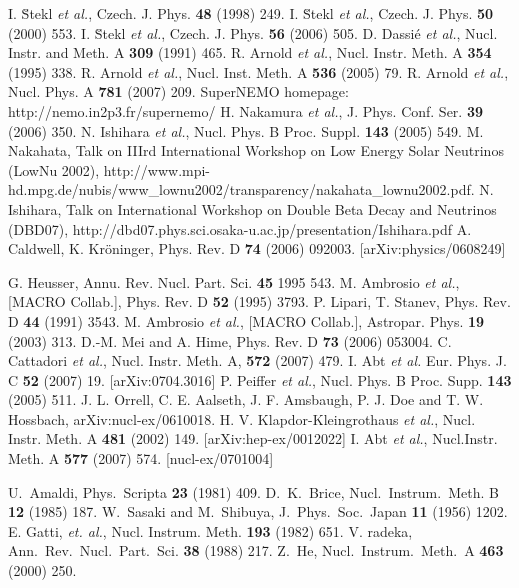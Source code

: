 \begin{thebibliography}{99}
I. \u{S}tekl \textit{et al.}, Czech. J. Phys. \textbf{48} (1998) 249.
I. \u{S}tekl \textit{et al.}, Czech. J. Phys. \textbf{50} (2000) 553.
I. \u{S}tekl \textit{et al.}, Czech. J. Phys. \textbf{56} (2006) 505.
D. Dassi\'{e} \textit{et al.}, Nucl. Instr. and Meth. A \textbf{309} (1991) 465.
R. Arnold \textit{et al.}, Nucl. Instr. Meth. A \textbf{354} (1995) 338.
R. Arnold \textit{et al.}, Nucl. Inst. Meth. A \textbf{536} (2005) 79.
R. Arnold \textit{et al.}, Nucl. Phys. A \textbf{781} (2007) 209.
SuperNEMO homepage: http://nemo.in2p3.fr/supernemo/
H. Nakamura \textit{et al.}, J. Phys. Conf. Ser. \textbf{39} (2006) 350.
N. Ishihara \textit{et al.}, Nucl. Phys. B Proc. Suppl. \textbf{143} (2005) 549.
M. Nakahata, Talk on IIIrd International Workshop on Low Energy Solar Neutrinos (LowNu 2002), http://www.mpi-hd.mpg.de/nubis/www\_lownu2002/transparency/nakahata\_lownu2002.pdf. 
N. Ishihara, Talk on International Workshop on Double Beta Decay and Neutrinos (DBD07), http://dbd07.phys.sci.osaka-u.ac.jp/presentation/Ishihara.pdf
A. Caldwell, K. Kr\"oninger, Phys. Rev. D \textbf{74}
(2006) 092003. [arXiv:physics/0608249]

G. Heusser, Annu. Rev. Nucl. Part. Sci. \textbf{45} 1995 543.
M. Ambrosio \textit{et al.}, [MACRO Collab.], Phys. Rev. D \textbf{52} (1995) 3793.
P. Lipari, T. Stanev, Phys. Rev. D \textbf{44} (1991) 3543.
M. Ambrosio \textit{et al.}, [MACRO Collab.], Astropar. Phys. \textbf{19} (2003) 313.
D.-M. Mei and A. Hime, Phys. Rev. D \textbf{73} (2006) 053004.
C. Cattadori \textit{et al.}, Nucl. Instr. Meth. A, \textbf{572} (2007) 479.
I. Abt \textit{et al.}  Eur. Phys. J. C \textbf{52}   (2007) 19. [arXiv:0704.3016]
P. Peiffer \textit{et al.}, Nucl. Phys. B   Proc. Supp. \textbf{143} (2005) 511.
J. L. Orrell, C. E. Aalseth, J. F. Amsbaugh, P. J. Doe   and T. W. Hossbach, arXiv:nucl-ex/0610018.
H. V. Klapdor-Kleingrothaus \textit{et al.},   Nucl. Instr. Meth. A \textbf{481} (2002) 149. [arXiv:hep-ex/0012022]
I. Abt \textit{et al.}, Nucl.Instr. Meth. A \textbf{577} (2007) 574. [nucl-ex/0701004]

U.~Amaldi, Phys.~Scripta \textbf{23} (1981) 409.
D.~K.~Brice, Nucl.~Instrum.~Meth. B \textbf{12} (1985) 187.
 W.~Sasaki and M.~Shibuya, J.~Phys.~Soc.~Japan   \textbf{11} (1956) 1202.
E. Gatti, \textit{et. al.}, Nucl. Instrum. Meth.   \textbf{193} (1982) 651.
 V. radeka, Ann.~Rev.~Nucl.~Part.~Sci. \textbf{38}
  (1988) 217.
 Z.~He, Nucl.~Instrum.~Meth.~A \textbf{463} (2000) 250.
\end{thebibliography}


